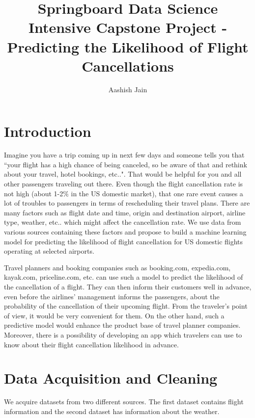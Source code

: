 \documentclass[12pt]{article}
\author{Aashish Jain}
\title{Springboard Data Science Intensive Capstone Project - Predicting the Likelihood of Flight Cancellations}
\begin{document}
\setcounter{page}{-1}
\maketitle
\thispagestyle{empty}
\thispagestyle{empty}
\newpage
\begingroup
\def\addvspace#1{}
\tableofcontents
\endgroup
\thispagestyle{empty}
\newpage
\large
\section{Introduction}
\label{Sec:intro}
Imagine you have a trip coming up in next few days and someone tells you that ``your flight has a high chance of being canceled, so be aware of that and rethink about your travel, hotel bookings, etc..". That would be helpful for you and all other passengers traveling out there. Even though the flight cancellation rate is not high (about 1-2$\%$ in the US domestic market), that one rare event causes a lot of troubles to passengers in terms of rescheduling their travel plans. There are many factors such as flight date and time, origin and destination airport, airline type, weather, etc.. which might affect the cancellation rate. We use data from various sources containing these factors and propose to build a machine learning model for predicting the likelihood of flight cancellation for US domestic flights operating at selected airports.


Travel planners and booking companies such as booking.com, expedia.com, kayak.com, priceline.com, etc. can use such a model to predict the likelihood of the cancellation of a flight. They can then inform their customers well in advance, even before the airlines' management informs the passengers, about the probability of the cancellation of their upcoming flight. From the traveler's point of view, it would be very convenient for them. On the other hand, such a predictive model would enhance the product base of travel planner companies. Moreover, there is a possibility of developing an app which travelers can use to know about their flight cancellation likelihood in advance.
\section{Data Acquisition and Cleaning}
\label{sec:dataclean}
We acquire datasets from two different sources. The first dataset contains flight information and the second dataset has information about the weather. 
\end{document}
